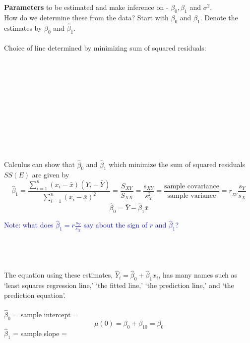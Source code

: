 \Large\textbf{Parameters} to be estimated and make inference on - $\beta_0, \beta_1$ and $\sigma^2$.\large\\
How do we determine these from the data?  Start with $\beta_0$ and $\beta_1$.  Denote the estimates by $\hat\beta_0$ and $\hat\beta_1$.\\~\\
Choice of line determined by minimizing sum of squared residuals:\\~\\~\\~\\~\\~\\~\\~\\~\\~\\~\\~\\
Calculus can show that $\hat\beta_0$ and $\hat\beta_1$ which minimize the sum of squared residuals $SS(E)$ are given by
$$\hat{\beta}_1=\frac{\sum_{i=1}^{n} (x_i-\bar{x})(Y_i-\bar{Y})}{\sum_{i=1}^{n} (x_i-\bar{x})^2}= \frac{S_{XY}}{S_{XX}} = \frac{s_{XY}}{s_X^2} = \frac{\mbox{sample covariance}}{\mbox{sample variance}} = r_{_{XY}} \frac{s_Y}{s_X}$$
$$\hat{\beta}_0=\bar{Y}-\hat{\beta}_1 \bar{x}$$

\textcolor{blue}{Note: what does $\hat{\beta}_1= r\frac{s_Y}{s_X} $ say about the sign of $r$ and $\hat{\beta}_1$?}\\~\\~\\~\\~\\

The equation using these estimates, $\hat{Y}_i=\hat\beta_0 + \hat\beta_1 x_i$, has many names such as `least squares regression line,' `the fitted line,' `the prediction line,' and `the prediction equation'.\\~\\
$\hat\beta_0$ = sample intercept = \\
$$\mu(0)=\beta_0+\beta_10=\beta_0$$
$\hat{\beta}_1$ = sample slope = \\

